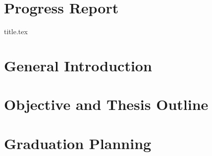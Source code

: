 \documentclass[10pt,a4paper]{article}
\begin{document}
\section*{Progress Report}

\cleardoublepage


{title.tex}









\section{General Introduction}

\cleardoublepage

\section{Objective and Thesis Outline}

\cleardoublepage


\section{Graduation Planning}

\cleardoublepage



\newpage



\cleardoublepage
\end{document}
